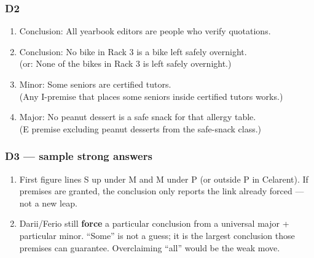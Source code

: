 \documentclass[11pt]{article}
\begin{document}
\subsubsection*{D2}
\begin{enumerate}
\item Conclusion: All yearbook editors are people who verify quotations.
\item Conclusion: No bike in Rack 3 is a bike left safely overnight. \\
(or: None of the bikes in Rack 3 is left safely overnight.)
\item Minor: Some seniors are certified tutors. \\
(Any I-premise that places some seniors inside certified tutors works.)
\item Major: No peanut dessert is a safe snack for that allergy table. \\
(E premise excluding peanut desserts from the safe-snack class.)
\end{enumerate}

\subsubsection*{D3 --- sample strong answers}
\begin{enumerate}
\item First figure lines S up under M and M under P (or outside P in Celarent). If premises are granted, the conclusion only reports the link already forced --- not a new leap.
\item Darii/Ferio still \textbf{force} a particular conclusion from a universal major + particular minor. ``Some'' is not a guess; it is the largest conclusion those premises can guarantee. Overclaiming ``all'' would be the weak move.
\end{enumerate}
\end{document}
